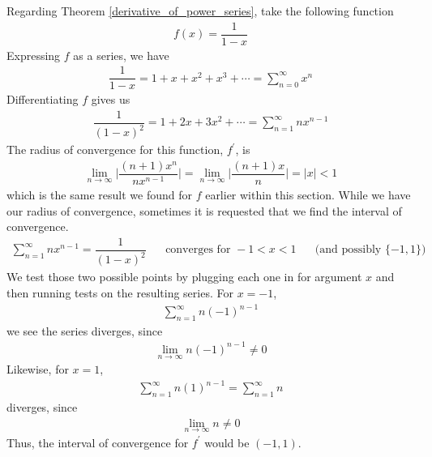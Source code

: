 \begin{example}
Regarding Theorem \ref{derivative_of_power_series}, take the following function
\begin{align*}
    f(x) = \dfrac{1}{1-x}
\end{align*}
Expressing $f$ as a series, we have
\begin{align*}
    \dfrac{1}{1-x} = 1 + x + x^{2} + x^{3} + \cdots = \sum_{n=0}^{\infty} x^{n}
\end{align*}
Differentiating $f$ gives us
\begin{align*}
    \dfrac{1}{(1-x)^{2}} = 1 + 2x + 3x^{2} + \cdots = \sum_{n=1}^{\infty} nx^{n-1}
\end{align*}
The radius of convergence for this function, $f^{'}$, is 
\begin{align*}
    \lim_{n \longrightarrow \infty} \Big\lvert \dfrac{(n+1)x^{n}}{nx^{n-1}}\Big\rvert = \lim_{n \longrightarrow \infty} \Big\lvert \dfrac{(n+1)x}{n}\Big\rvert = \lvert x \rvert < 1
\end{align*}
which is the same result we found for $f$ earlier within this section. While we have our radius of convergence, sometimes it is requested that we find the interval of convergence. 
\begin{align*}
    \sum_{n=1}^{\infty} nx^{n-1} = \dfrac{1}{(1-x)^{2}} \hspace{20pt} \text{converges for} \hspace{4pt} -1 < x < 1 \hspace{20pt} \text{(and possibly $\{-1, 1\}$)}
\end{align*}
We test those two possible points by plugging each one in for argument $x$ and then running tests on the resulting series. For $x = -1$,
\begin{align*}
    \sum_{n=1}^{\infty} n(-1)^{n-1}
\end{align*}
we see the series diverges, since
\begin{align*}
    \lim_{n \longrightarrow \infty} n(-1)^{n-1} \neq 0
\end{align*}
Likewise, for $x = 1$,
\begin{align*}
    \sum_{n=1}^{\infty} n(1)^{n-1} = \sum_{n=1}^{\infty} n
\end{align*}
diverges, since
\begin{align*}
    \lim_{n \longrightarrow \infty} n \neq 0
\end{align*}
Thus, the interval of convergence for $f^{'}$ would be $(-1, 1)$.
\end{example}

